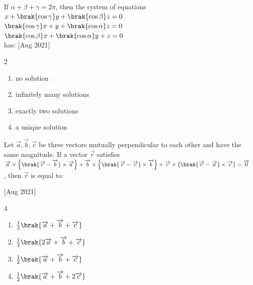  
    \item If $\alpha+\beta+\gamma=2\pi$, then the system of equations\\
    $x+\brak{\cos\gamma}y+\brak{\cos\beta}z=0$\\
    $\brak{\cos\gamma}x+y+\brak{\cos\alpha}z=0$\\
    $\brak{\cos\beta}x+\brak{\cos\alpha}y+z=0$\\
    has:
    \hfill{[Aug 2021]}

        \begin{multicols}{2}
            \begin{enumerate}
                \item no solution
                \item infinitely many solutions
                \item exactly two solutions
                \item a unique solution
            \end{enumerate}
        \end{multicols}

    \item Let $\overrightarrow{a},\overrightarrow{b},\overrightarrow{c}$ be three vectors mutually perpendicular to each other and have the same magnitude. If a vector $\overrightarrow{r}$ satisfies 
    $\overrightarrow{a}\times\left\{ \brak{\overrightarrow{r}-\overrightarrow{b}}\times\overrightarrow{a} \right\} + \overrightarrow{b}\times\left\{ \brak{\overrightarrow{r}-\overrightarrow{c}}\times\overrightarrow{b} \right\} + \overrightarrow{c}\times\left\{ \brak{\overrightarrow{r}-\overrightarrow{a}}\times\overrightarrow{c} \right\} = \overrightarrow{0}$, then $\overrightarrow{r}$ is equal to:
    
    \hfill{[Aug 2021]}

		\begin{multicols}{4}
			\begin{enumerate}
				\item $\frac{1}{3}\brak{\overrightarrow{a}+\overrightarrow{b}+\overrightarrow{c}}$
				\item $\frac{1}{3}\brak{2\overrightarrow{a}+\overrightarrow{b}+\overrightarrow{c}}$
				\item $\frac{1}{2}\brak{\overrightarrow{a}+\overrightarrow{b}+\overrightarrow{c}}$
				\item $\frac{1}{2}\brak{\overrightarrow{a}+\overrightarrow{b}+2\overrightarrow{c}}$
			\end{enumerate}
		\end{multicols}

